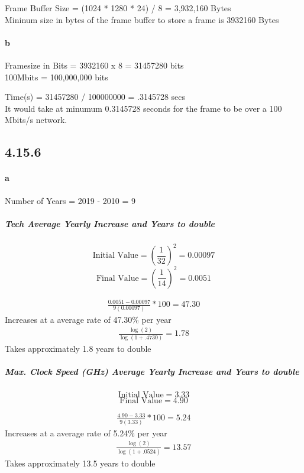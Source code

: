 \documentclass{article}
\begin{document}
    Frame Buffer Size = (1024 * 1280 * 24) / 8 = 3,932,160 Bytes \\
    
    Mininum size in bytes of the frame buffer to store a frame is 3932160 Bytes
    \paragraph*{b} Framesize in Bits = 3932160 x 8 = 31457280 bits \\
    
    100Mbits = 100,000,000 bits

    Time(s) = 31457280 / 100000000 = .3145728 secs\\

    It would take at minumum 0.3145728 seconds for the frame to be over a 100 Mbits/s network.

    \subsection*{4.15.6}
    \paragraph*{a} 
    Number of Years = 2019 - 2010 = 9
    \subparagraph*{Tech Average Yearly Increase and Years to double}
    
    \[ \text{Initial Value} = \left(\frac{1}{32}\right)^2 = 0.00097 \]   
    \[ \text{Final Value} = \left(\frac{1}{14}\right)^2 = 0.0051 \]    

   \begin{align*}
        \frac{0.0051-0.00097}{9(0.00097)} * 100 = 47.30%
    \end{align*}
    Increases at a average rate of 47.30\% per year
    \begin{align*}
        \frac{\log(2)}{\log(1+.4730)} = 1.78
    \end{align*}
    Takes approximately 1.8 years to double

    \subparagraph*{Max. Clock Speed (GHz) Average Yearly Increase and Years to double}
    
    \[ \text{Initial Value} = 3.33 \]   
    \[ \text{Final Value} = 4.90 \]    

   \begin{align*}
        \frac{4.90-3.33}{9(3.33)} * 100 = 5.24%
    \end{align*}
    Increases at a average rate of 5.24\% per year
    \begin{align*}
        \frac{\log(2)}{\log(1+.0524)} = 13.57
    \end{align*}
    Takes approximately 13.5 years to double
\end{document}
